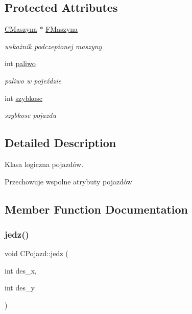 \subsection*{Protected Attributes}
\begin{DoxyCompactItemize}
\item 
\mbox{\label{class_c_pojazd_abe30e6d7e643b969f41c9914ba97280a}} 
\mbox{\hyperlink{class_c_maszyna}{C\+Maszyna}} $\ast$ \mbox{\hyperlink{class_c_pojazd_abe30e6d7e643b969f41c9914ba97280a}{F\+Maszyna}}
\begin{DoxyCompactList}\small\item\em wskażnik podczepionej maszyny \end{DoxyCompactList}\item 
\mbox{\label{class_c_pojazd_accde27ae44aab73f56cfb2b497e30eab}} 
int \mbox{\hyperlink{class_c_pojazd_accde27ae44aab73f56cfb2b497e30eab}{paliwo}}
\begin{DoxyCompactList}\small\item\em paliwo w pojeździe \end{DoxyCompactList}\item 
\mbox{\label{class_c_pojazd_a5af2e841175da5b531f77d46879dd56c}} 
int \mbox{\hyperlink{class_c_pojazd_a5af2e841175da5b531f77d46879dd56c}{szybkosc}}
\begin{DoxyCompactList}\small\item\em szybkosc pojazdu \end{DoxyCompactList}\end{DoxyCompactItemize}


\subsection{Detailed Description}
Klasa logiczna pojazdów. 

Przechowuje wspolne atrybuty pojazdów 

\subsection{Member Function Documentation}
\mbox{\label{class_c_pojazd_ae5b5838c2c769399f73216e02c181c84}} 
\subsubsection{\texorpdfstring{jedz()}{jedz()}}
{\footnotesize\ttfamily void C\+Pojazd\+::jedz (\begin{DoxyParamCaption}\item[{int}]{des\+\_\+x,  }\item[{int}]{des\+\_\+y }\end{DoxyParamCaption})}



